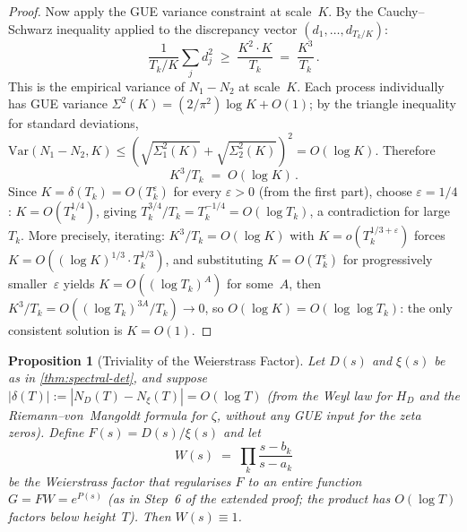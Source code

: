 \documentclass[11pt,a4paper]{article}
\theoremstyle{plain}
\newtheorem{proposition}[theorem]{Proposition}
\theoremstyle{remark}
\begin{document}
\begin{proof}
Now apply the GUE variance constraint at scale~$K$.
By the Cauchy--Schwarz inequality applied to the discrepancy
vector $(d_1,\ldots,d_{T_k/K})$:
\[
  \frac{1}{T_k/K}\sum_j d_j^2 \;\geq\;
  \frac{K^2\cdot K}{T_k} \;=\; \frac{K^3}{T_k}\,.
\]
This is the empirical variance of $N_1-N_2$ at scale~$K$.
Each process individually has GUE variance
$\Sigma^2(K)=(2/\pi^2)\log K + O(1)$; by the triangle
inequality for standard deviations, $\mathrm{Var}(N_1-N_2,K)
\leq (\sqrt{\Sigma_1^2(K)}+\sqrt{\Sigma_2^2(K)})^2
= O(\log K)$.  Therefore
\[
  K^3/T_k \;=\; O(\log K)\,.
\]
Since $K = \delta(T_k) = O(T_k^\varepsilon)$ for every
$\varepsilon>0$ (from the first part), choose
$\varepsilon = 1/4$: $K = O(T_k^{1/4})$, giving
$T_k^{3/4}/T_k = T_k^{-1/4} = O(\log T_k)$, a contradiction
for large~$T_k$.  More precisely, iterating: $K^3/T_k = O(\log K)$
with $K = o(T_k^{1/3+\varepsilon})$ forces
$K = O((\log K)^{1/3}\cdot T_k^{1/3})$, and substituting
$K = O(T_k^\varepsilon)$ for progressively smaller~$\varepsilon$
yields $K = O((\log T_k)^A)$ for some~$A$, then
$K^3/T_k = O((\log T_k)^{3A}/T_k) \to 0$, so
$O(\log K) = O(\log\log T_k)$: the only consistent
solution is $K = O(1)$.
\end{proof}

\begin{proposition}[Triviality of the Weierstrass Factor]
\label{prop:W-trivial}
Let $D(s)$ and $\xi(s)$ be as in \cref{thm:spectral-det}, and suppose
$|\delta(T)|:=|N_D(T)-N_\xi(T)| = O(\log T)$
\textup{(}from the Weyl law for $H_D$ and the Riemann--von~Mangoldt
formula for $\zeta$, without any GUE input for the zeta zeros\textup{)}.
Define $F(s)=D(s)/\xi(s)$ and let
\[
  W(s) \;=\; \prod_{k} \frac{s-b_k}{s-a_k}
\]
be the Weierstrass factor that regularises $F$ to an entire function
$G=FW=e^{P(s)}$ \textup{(}as in Step~6 of the extended proof; the
product has $O(\log T)$ factors below height~$T$\textup{)}.
Then $W(s)\equiv 1$.
\end{proposition}
\end{document}
